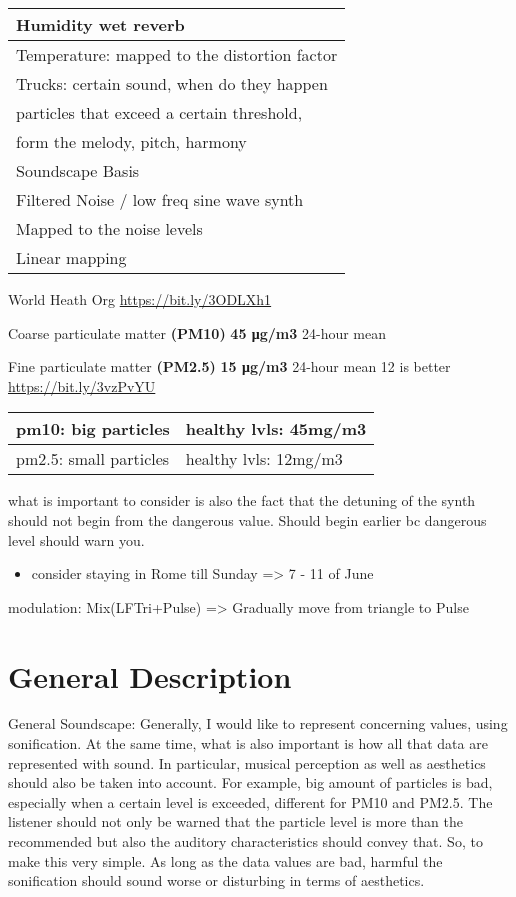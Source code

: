 \documentclass[11pt]{article}
\author{Jason SK}
\date{\today}
\title{}
\begin{document}
\begin{center}
\begin{tabular}{l}
\hline
Humidity wet reverb\\
\hline
Temperature: mapped to the distortion factor\\
\hline
Trucks: certain sound, when do they happen\\
\hline
particles that exceed a certain threshold,\\
form the melody, pitch, harmony\\
\hline
Soundscape Basis\\
Filtered Noise / low freq sine wave synth\\
Mapped to the noise levels\\
Linear mapping\\
\hline
\end{tabular}
\end{center}


World Heath Org \url{https://bit.ly/3ODLXh1}

Coarse particulate matter \textbf{(PM10)}
\textbf{45 μg/m3} 24-hour mean

Fine particulate matter \textbf{(PM2.5)}
\textbf{15 μg/m3} 24-hour mean
12 is better \url{https://bit.ly/3vzPvYU}


\begin{center}
\begin{tabular}{ll}
\hline
pm10: big particles & healthy lvls: 45mg/m3\\
\hline
pm2.5: small particles & healthy lvls: 12mg/m3\\
\hline
\end{tabular}
\end{center}

what is important to consider is also the fact that the detuning of the synth should not begin from the dangerous value. Should begin earlier bc dangerous level should warn you.

\begin{itemize}
\item consider staying in Rome till Sunday => 7 - 11 of June
\end{itemize}

modulation: Mix(LFTri+Pulse) => Gradually move from triangle to Pulse


\section{General Description}
\label{sec:orgc421040}
General Soundscape: Generally, I would like to represent concerning values, using sonification.  At the same time, what is also important is how all that data are represented with sound.  In particular, musical perception as well as aesthetics should also be taken into account.  For example, big amount of particles is bad, especially when a certain level is exceeded, different for PM10 and PM2.5.  The listener should not only be warned that the particle level is more than the recommended but also the auditory characteristics should convey that.  So, to make this very simple.  As long as the data values are bad, harmful the sonification should sound worse or disturbing in terms of aesthetics.
\end{document}
